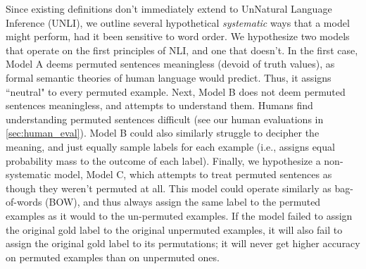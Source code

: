 \documentclass[11pt,a4paper]{article}
\begin{document}
Since existing definitions don't immediately extend to UnNatural Language Inference (UNLI), we outline several hypothetical \textit{systematic} ways that a model might perform, had it been sensitive to word order. We hypothesize two models that operate on the first principles of NLI, and one that doesn't. In the first case, Model A deems permuted sentences meaningless (devoid of truth values), as formal semantic theories of human language would predict. Thus, it assigns ``neutral" to every permuted example. Next, Model B does not deem permuted sentences meaningless, and attempts to understand them. Humans find understanding permuted sentences difficult (see our human evaluations in \autoref{sec:human_eval}). Model B could also similarly struggle to decipher the meaning, and just equally sample labels for each example (i.e., assigns equal probability mass to the outcome of each label). Finally, we hypothesize a non-systematic model, Model C, which attempts to treat permuted sentences as though they weren't permuted at all. This model could operate similarly as bag-of-words (BOW), and thus always assign the same label to the permuted examples as it would to the un-permuted examples. If the model failed to assign the original gold label to the original unpermuted examples, it will also fail to assign the original gold label to its permutations; it will never get higher accuracy on permuted examples than on unpermuted ones. 
\end{document}
